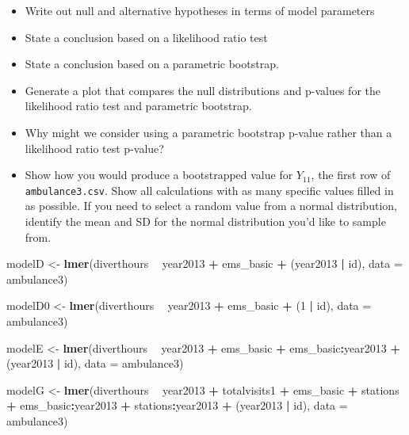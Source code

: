 \documentclass[
]{krantz}
\newenvironment{Shaded}{\begin{snugshade}}{\end{snugshade}}
\newcommand{\DataTypeTok}[1]{\textcolor[rgb]{0.27,0.27,0.27}{#1}}
\newcommand{\DecValTok}[1]{\textcolor[rgb]{0.06,0.06,0.06}{#1}}
\newcommand{\KeywordTok}[1]{\textcolor[rgb]{0.27,0.27,0.27}{\textbf{#1}}}
\newcommand{\NormalTok}[1]{#1}
\newcommand{\OperatorTok}[1]{\textcolor[rgb]{0.43,0.43,0.43}{\textbf{#1}}}
\newcommand{\StringTok}[1]{\textcolor[rgb]{0.5,0.5,0.5}{#1}}
\providecommand{\tightlist}{%
  \setlength{\itemsep}{0pt}\setlength{\parskip}{0pt}}
\begin{document}
\begin{enumerate}
  \begin{itemize}
  \tightlist
  \item
    Write out null and alternative hypotheses in terms of model parameters
  \item
    State a conclusion based on a likelihood ratio test
  \item
    State a conclusion based on a parametric bootstrap.
  \item
    Generate a plot that compares the null distributions and p-values for the likelihood ratio test and parametric bootstrap.
  \item
    Why might we consider using a parametric bootstrap p-value rather than a likelihood ratio test p-value?
  \item
    Show how you would produce a bootstrapped value for \(Y_{11}\), the first row of \texttt{ambulance3.csv}. Show all calculations with as many specific values filled in as possible. If you need to select a random value from a normal distribution, identify the mean and SD for the normal distribution you'd like to sample from.
  \end{itemize}
\end{enumerate}

\begin{Shaded}
\begin{Highlighting}[]
\NormalTok{modelD <-}\StringTok{ }\KeywordTok{lmer}\NormalTok{(diverthours }\OperatorTok{~}\StringTok{ }\NormalTok{year2013 }\OperatorTok{+}\StringTok{ }\NormalTok{ems_basic }\OperatorTok{+}\StringTok{ }
\StringTok{  }\NormalTok{(year2013 }\OperatorTok{|}\StringTok{ }\NormalTok{id), }\DataTypeTok{data =}\NormalTok{ ambulance3)}

\NormalTok{modelD0 <-}\StringTok{ }\KeywordTok{lmer}\NormalTok{(diverthours }\OperatorTok{~}\StringTok{ }\NormalTok{year2013 }\OperatorTok{+}\StringTok{ }\NormalTok{ems_basic }\OperatorTok{+}\StringTok{ }
\StringTok{  }\NormalTok{(}\DecValTok{1} \OperatorTok{|}\StringTok{ }\NormalTok{id), }\DataTypeTok{data =}\NormalTok{ ambulance3)}

\NormalTok{modelE <-}\StringTok{ }\KeywordTok{lmer}\NormalTok{(diverthours }\OperatorTok{~}\StringTok{ }\NormalTok{year2013 }\OperatorTok{+}\StringTok{ }\NormalTok{ems_basic }\OperatorTok{+}
\StringTok{  }\NormalTok{ems_basic}\OperatorTok{:}\NormalTok{year2013 }\OperatorTok{+}\StringTok{ }\NormalTok{(year2013 }\OperatorTok{|}\StringTok{ }\NormalTok{id), }\DataTypeTok{data =}\NormalTok{ ambulance3)}

\NormalTok{modelG <-}\StringTok{ }\KeywordTok{lmer}\NormalTok{(diverthours }\OperatorTok{~}\StringTok{ }\NormalTok{year2013 }\OperatorTok{+}\StringTok{ }\NormalTok{totalvisits1 }\OperatorTok{+}\StringTok{ }
\StringTok{  }\NormalTok{ems_basic }\OperatorTok{+}\StringTok{ }\NormalTok{stations }\OperatorTok{+}\StringTok{ }\NormalTok{ems_basic}\OperatorTok{:}\NormalTok{year2013 }\OperatorTok{+}\StringTok{ }
\StringTok{  }\NormalTok{stations}\OperatorTok{:}\NormalTok{year2013 }\OperatorTok{+}\StringTok{ }\NormalTok{(year2013 }\OperatorTok{|}\StringTok{ }\NormalTok{id), }\DataTypeTok{data =}\NormalTok{ ambulance3)}
\end{Highlighting}
\end{Shaded}
\end{document}
